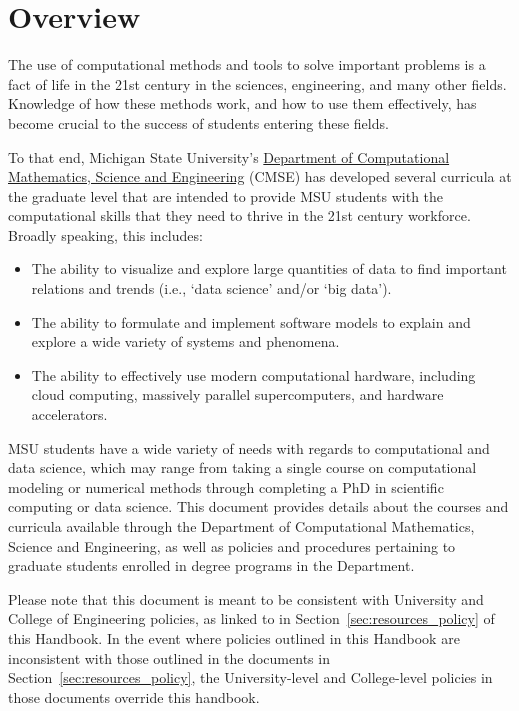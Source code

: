 \section{Overview}
\label{sec:overview}

The use of computational methods and tools to solve important problems
is a fact of life in the 21st century in the sciences, engineering,
and many other fields.  Knowledge of how these methods work, and how
to use them effectively, has become crucial to the success of students
entering these fields.

To that end, Michigan State University's \href{http://cmse.msu.edu}{Department of Computational
Mathematics, Science and Engineering} (CMSE) has developed several
curricula at the graduate level that are intended to provide MSU
students with the computational skills that they need to thrive in the
21st century workforce.  Broadly speaking, this includes:

\begin{itemize}
\item The ability to visualize and explore large quantities of data to
  find important relations and trends (i.e., `data science' and/or
  `big data').

\item The ability to formulate and implement  software models to
  explain and explore a wide variety of systems and phenomena.

\item The ability to effectively use modern computational hardware,
  including cloud computing, massively parallel supercomputers, and
  hardware accelerators.

\end{itemize}

MSU students have a wide variety of needs with regards to
computational and data science, which may range from taking a single
course on computational modeling or numerical methods through
completing a PhD in scientific computing or data science.  This
document provides details about the courses and curricula available
through the Department of Computational Mathematics, Science and
Engineering, as well as policies and procedures pertaining to graduate
students enrolled in degree programs in the Department.

Please note that this document is meant to be consistent with
University and College of Engineering policies, as linked to in
Section~\ref{sec:resources_policy} of this Handbook.  In the event
where policies outlined in this Handbook are inconsistent with those
outlined in the documents in Section~\ref{sec:resources_policy}, the
University-level and College-level policies in those documents
override this handbook.
